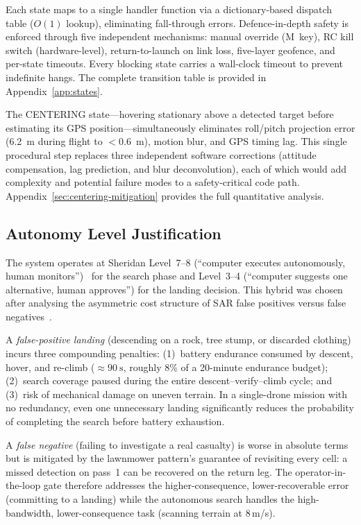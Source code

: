 \noindent Each state maps to a single handler function via a dictionary-based dispatch table ($O(1)$ lookup), eliminating fall-through errors. Defence-in-depth safety is enforced through five independent mechanisms: manual override (M~key), RC kill switch (hardware-level), return-to-launch on link loss, five-layer geofence, and per-state timeouts. Every blocking state carries a wall-clock timeout to prevent indefinite hangs. The complete transition table is provided in Appendix~\ref{app:states}.

The CENTERING state---hovering stationary above a detected target before estimating its GPS position---simultaneously eliminates roll/pitch projection error (\SI{6.2}{\metre} during flight to $<$\SI{0.6}{\metre}), motion blur, and GPS timing lag. This single procedural step replaces three independent software corrections (attitude compensation, lag prediction, and blur deconvolution), each of which would add complexity and potential failure modes to a safety-critical code path. Appendix~\ref{sec:centering-mitigation} provides the full quantitative analysis.

\subsection{Autonomy Level Justification}\label{sec:autonomy-rationale}

The system operates at Sheridan Level~7--8 (``computer executes autonomously, human monitors'')~\cite{sheridan2002humans} for the search phase and Level~3--4 (``computer suggests one alternative, human approves'') for the landing decision. This hybrid was chosen after analysing the asymmetric cost structure of SAR false positives versus false negatives~\cite{endsley1999loa, cummings2014man_uav}.

A \emph{false-positive landing} (descending on a rock, tree stump, or discarded clothing) incurs three compounding penalties: (1)~battery endurance consumed by descent, hover, and re-climb (${\approx}\SI{90}{\second}$, roughly 8\% of a 20-minute endurance budget); (2)~search coverage paused during the entire descent--verify--climb cycle; and (3)~risk of mechanical damage on uneven terrain. In a single-drone mission with no redundancy, even one unnecessary landing significantly reduces the probability of completing the search before battery exhaustion.

A \emph{false negative} (failing to investigate a real casualty) is worse in absolute terms but is mitigated by the lawnmower pattern's guarantee of revisiting every cell: a missed detection on pass~1 can be recovered on the return leg. The operator-in-the-loop gate therefore addresses the higher-consequence, lower-recoverable error (committing to a landing) while the autonomous search handles the high-bandwidth, lower-consequence task (scanning terrain at 8\,m/s).

